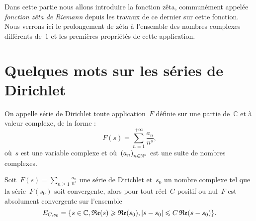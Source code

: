 	Dans cette partie nous allons introduire la fonction zêta, communément appelée \emph{fonction zêta de Riemann} depuis les travaux de ce dernier sur cette fonction. Nous verrons ici le prolongement de zêta à l'ensemble des nombres complexes différents de~$1$ et les premières propriétés de cette application.
\section{Quelques mots sur les séries de Dirichlet}
		\begin{defi}
			On appelle série de Dirichlet toute application~$F$ définie sur une partie de~$\mathbb{C}$ et à valeur complexe, de la forme :
			\[
				F(s) = \sum_{n=1}^{+\infty} \frac{a_n}{n^s},
			\]
			où~$s$ est une variable complexe et où~$\suite*{a}$ est une suite de nombres complexes.
		\end{defi}
		\begin{prop}
			Soit~$F(s)=\sum_{n\geq 1} \frac{a_n}{n^s}$ une série de Dirichlet et~$s_0$ un nombre complexe tel que la série~$F(s_0)$ soit convergente, alors pour tout réel~$C$ positif ou nul~$F$ est absolument convergente sur l'ensemble
			\[
				E_{C,s_0} = \{s\in\mathbb{C},\mathfrak{Re}(s)\geqslant\mathfrak{Re}(s_0),\left\vert s-s_0\right\vert\leqslant C\,\mathfrak{Re}(s-s_0)\}.
			\]
		\end{prop}
